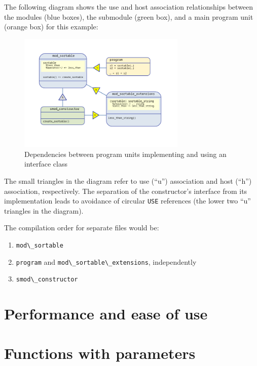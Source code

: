\documentclass[
  paper=a4,
  ,captions=tableheading
]{scrartcl}
\newcommand{\passthrough}[1]{#1}
\providecommand{\tightlist}{%
  \setlength{\itemsep}{0pt}\setlength{\parskip}{0pt}}
\begin{document}
The following diagram shows the use and host association relationships
between the modules (blue boxes), the submodule (green box), and a main
program unit (orange box) for this example:

\begin{figure}
\centering
\includegraphics[width=8cm,height=\textheight,keepaspectratio]{Dependency_inversion.svg.png}
\caption{Dependencies between program units implementing and using an
interface class}
\end{figure}

The small triangles in the diagram refer to use (``u'') association and
host (``h'') association, respectively. The separation of the
constructor's interface from its implementation leads to avoidance of
circular \passthrough{\lstinline!USE!} references (the lower two ``u''
triangles in the diagram).

The compilation order for separate files would be:

\begin{enumerate}
\def\labelenumi{\arabic{enumi}.}
\tightlist
\item
  \passthrough{\lstinline!mod\_sortable!}
\item
  \passthrough{\lstinline!program!} and
  \passthrough{\lstinline!mod\_sortable\_extensions!}, independently
\item
  \passthrough{\lstinline!smod\_constructor!}
\end{enumerate}

\section{Performance and ease of use}\label{performance-and-ease-of-use}

\section{Functions with parameters}\label{sec:functions_with_parameters}
\end{document}
